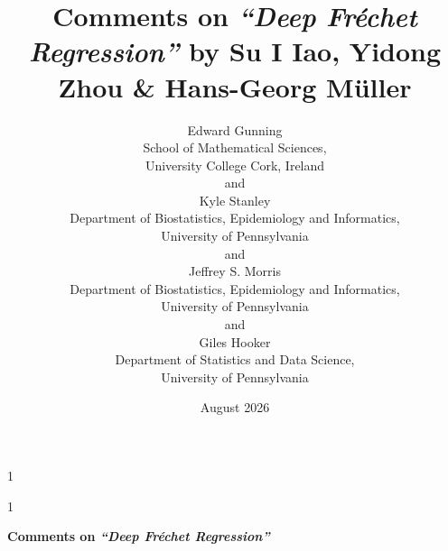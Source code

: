 \documentclass[12pt]{article}
\newcommand{\Frechet}{Fr\'echet\xspace}
\newcommand{\anon}{1}
\begin{document}
\def\spacingset#1{\renewcommand{\baselinestretch}{#1}\small\normalsize}
\spacingset{1}

\anon
{
  \title{\bf Comments on \emph{``Deep \Frechet Regression''} by Su I Iao, Yidong Zhou \& Hans-Georg Müller}
  \author{
    Edward Gunning\hspace{.2cm}\\
    School of Mathematical Sciences,\\ University College Cork, Ireland\\
    and\\
    Kyle Stanley\\
    Department of Biostatistics, Epidemiology and Informatics, \\University of Pennsylvania\\
    and\\
    Jeffrey S. Morris\\
    Department of Biostatistics, Epidemiology and Informatics,\\ University of Pennsylvania\\
    and\\
    Giles Hooker\\
    Department of Statistics and Data Science,\\ University of Pennsylvania}
  \date{August 2026}
  \maketitle
} \fi

\anon
{
  \bigskip
  \bigskip
  \bigskip
  \begin{center}
    {\LARGE\bf Comments on \emph{``Deep \Frechet Regression''}}
  \end{center}
  \medskip
} \fi

\bigskip


\vfill

\newpage
\spacingset{1.8}










\end{document}
